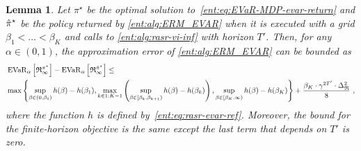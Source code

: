 \documentclass[twoside]{article}
\newcommand{\opt}{^\star}
\newcommand{\vspan}{\Delta_{\mathfrak{R}}}
\newcommand{\evar}[2]{\operatorname{EVaR}_{#1} \left[#2\right]}
\theoremstyle{plain}
\newtheorem{lemma}[theorem]{Lemma}
\theoremstyle{definition}
\theoremstyle{remark}
\begin{document}
\begin{lemma}\label{ent:lem:evar-bound-decomposition}
Let $\pi\opt $ be the optimal solution to~\eqref{ent:eq:EVaR-MDP-evar-return} and $\api$ be the policy returned by \cref{ent:alg:ERM_EVAR} when it is executed with a grid $\beta_1 < \ldots < \beta_K$ and calls to \cref{ent:alg:rasr-vi-inf} with horizon $T'$. Then, for any $\alpha\in (0,1)$, the approximation error of \cref{ent:alg:ERM_EVAR} can be bounded as
%
\begin{align} \label{ent:eq:evar-decomposition}
&\evar{\alpha}{\mathfrak{R}_{\infty}^{\pi\opt}} - \evar{\alpha}{\mathfrak{R}_{\infty}^{\api}} \le \\ 
&\max\, \Biggl\{
\sup_{\beta\in (0,\beta_1)} h(\beta) - h(\beta_1), 
\max_{k\in 1{:}K{-}1} \left( \sup_{\beta \in [\beta_k,\beta_{k+1})} h(\beta) - h(\beta_k) \right), 
\sup_{\beta\in [\beta_K, \infty)} h(\beta) - h(\beta_K) \Biggr\} + \frac{\beta_K \cdot \gamma^{2T'} \cdot \vspan^2}{8}~, \nonumber
\end{align}
%
where the function $h$ is defined by~\eqref{ent:eq:rasr-evar-ref}. Moreover, the bound for the finite-horizon objective is the same except the last term that depends on $T'$ is zero. 
\end{lemma}
\end{document}
